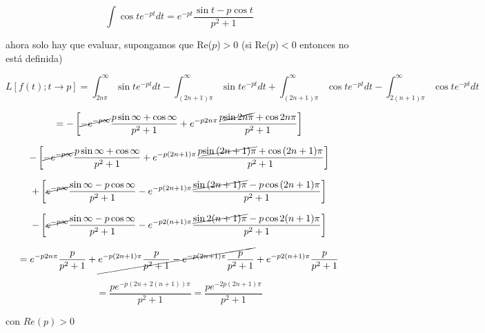 \documentclass[12pt,a4paper]{article}
\begin{document}
\begin{enumerate}
    \begin{equation*}
        \int \cos{t}e^{-pt}dt=e^{-pt}\frac{\sin{t}-p\cos{t}}{p^2+1}
    \end{equation*}
    
    ahora solo hay que evaluar, supongamos que Re($p$)$>0$ (si Re($p$)$<0$ entonces no está definida)
    
    \begin{equation*}
        L[f(t);t \rightarrow p]= \int_{2n\pi}^{\infty}\sin{t}e^{-pt} dt-\int_{(2n+1)\pi}^{\infty}\sin{t} e^{-pt} dt + \int_{(2n+1)\pi}^{\infty}\cos{t}e^{-pt} dt-\int_{2(n+1)\pi}^{\infty}\cos{t}e^{-pt} dt
    \end{equation*}
    
    \begin{equation*}
        =-\left[\cancel{-e^{-p\infty}}\frac{p\sin{\infty}+\cos{\infty}}{p^2+1}+e^{-p2n\pi}\frac{p\cancel{\sin{2n\pi}}+\cos{2n\pi}}{p^2+1}\right]
    \end{equation*}
    
    \begin{equation*}
        -\left[\cancel{-e^{-p\infty}}\frac{p\sin{\infty}+\cos{\infty}}{p^2+1}+e^{-p(2n+1)\pi}\frac{p\cancel{\sin{(2n+1)\pi}}+\cos{(2n+1)\pi}}{p^2+1}\right]
    \end{equation*}
    
    \begin{equation*}
        +\left[\cancel{e^{-p\infty}}\frac{\sin{\infty}-p\cos{\infty}}{p^2+1}-e^{-p(2n+1)\pi}\frac{\cancel{\sin{(2n+1)\pi}}-p\cos{(2n+1)\pi}}{p^2+1}\right]
    \end{equation*}
    
    \begin{equation*}
        -\left[\cancel{e^{-p\infty}}\frac{\sin{\infty}-p\cos{\infty}}{p^2+1}-e^{-p2(n+1)\pi}\frac{\cancel{\sin{2(n+1)\pi}}-p\cos{2(n+1)\pi}}{p^2+1} \right]
    \end{equation*}
    
    \begin{equation*}
        =e^{-p2n\pi}\frac{p}{p^2+1}+\cancel{e^{-p(2n+1)\pi}\frac{p}{p^2+1}-e^{-p(2n+1)\pi}\frac{p}{p^2+1}}+e^{-p2(n+1)\pi} \frac{p}{p^2+1}
    \end{equation*}
    
    \begin{equation*}
        =\frac{pe^{-p(2n+2(n+1))\pi}}{p^2+1}=\frac{pe^{-2p(2n+1)\pi}}{p^2+1}
    \end{equation*}
    
    con $Re(p)> 0$
    
\end{enumerate}
\end{document}
